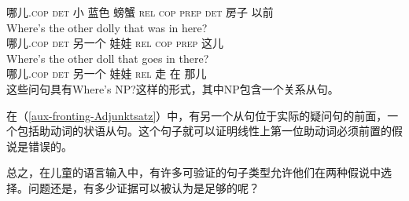 哪儿.\textsc{cop} \textsc{det} 小 蓝色 螃蟹 \textsc{rel} \textsc{cop} \textsc{prep} \textsc{det} 房子 以前\\
\ex 
\gll Where's the other dolly that was in here?\\
哪儿.\textsc{cop} \textsc{det} 另一个 娃娃  \textsc{rel} \textsc{cop} \textsc{prep} 这儿\\
\ex 
\gll Where's the other doll that goes in there?\\
哪儿.\textsc{cop} \textsc{det} 另一个 娃娃 \textsc{rel} 走 在 那儿 \\
\zl
这些问句具有Where's NP?这样的形式，其中NP包含一个关系从句。

在（\ref{aux-fronting-Adjunktsatz}）中，有另一个从句位于实际的疑问句的前面，一个包括助动词的状语从句。这个句子就可以证明线性上第一位助动词必须前置的假说是错误的\citep[]{Sampson89a}。

总之，在儿童的语言输入中，有许多可验证的句子类型允许他们在两种假说中选择。问题还是，有多少证据可以被认为是足够的呢？


